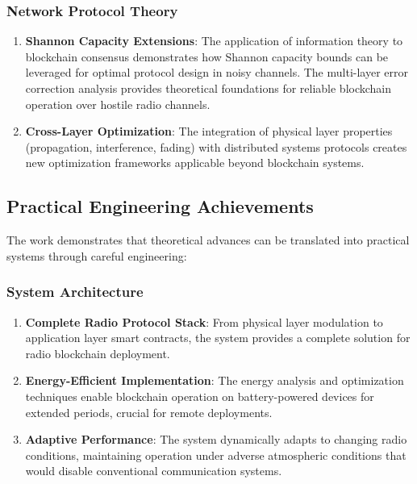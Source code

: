 \documentclass[11pt,a4paper]{article}
\begin{document}
\subsubsection{Network Protocol Theory}

\begin{enumerate}
\item \textbf{Shannon Capacity Extensions}: The application of information theory to blockchain consensus demonstrates how Shannon capacity bounds can be leveraged for optimal protocol design in noisy channels. The multi-layer error correction analysis provides theoretical foundations for reliable blockchain operation over hostile radio channels.

\item \textbf{Cross-Layer Optimization}: The integration of physical layer properties (propagation, interference, fading) with distributed systems protocols creates new optimization frameworks applicable beyond blockchain systems.
\end{enumerate}

\subsection{Practical Engineering Achievements}

The work demonstrates that theoretical advances can be translated into practical systems through careful engineering:

\subsubsection{System Architecture}

\begin{enumerate}
\item \textbf{Complete Radio Protocol Stack}: From physical layer modulation to application layer smart contracts, the system provides a complete solution for radio blockchain deployment.

\item \textbf{Energy-Efficient Implementation}: The energy analysis and optimization techniques enable blockchain operation on battery-powered devices for extended periods, crucial for remote deployments.

\item \textbf{Adaptive Performance}: The system dynamically adapts to changing radio conditions, maintaining operation under adverse atmospheric conditions that would disable conventional communication systems.
\end{enumerate}
\end{document}
